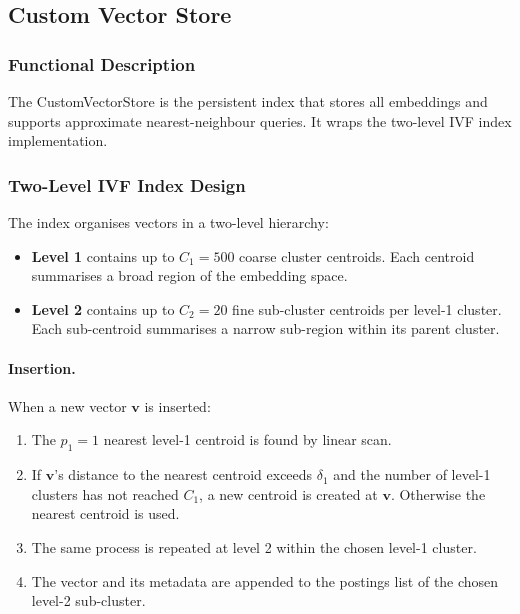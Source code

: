 \documentclass[12pt, a4paper]{report}
\begin{document}
\subsection{Custom Vector Store}

\subsubsection{Functional Description}

The CustomVectorStore is the persistent index that stores all embeddings
and supports approximate nearest-neighbour queries. It wraps the two-level
IVF index implementation.

\subsubsection{Two-Level IVF Index Design}

The index organises vectors in a two-level hierarchy:

\begin{itemize}
  \item \textbf{Level 1} contains up to $C_1 = 500$ coarse cluster centroids.
    Each centroid summarises a broad region of the embedding space.
  \item \textbf{Level 2} contains up to $C_2 = 20$ fine sub-cluster
    centroids per level-1 cluster. Each sub-centroid summarises a narrow
    sub-region within its parent cluster.
\end{itemize}

\paragraph{Insertion.}
When a new vector $\mathbf{v}$ is inserted:
\begin{enumerate}
  \item The $p_1 = 1$ nearest level-1 centroid is found by linear scan.
  \item If $\mathbf{v}$'s distance to the nearest centroid exceeds $\delta_1$
    and the number of level-1 clusters has not reached $C_1$, a new centroid
    is created at $\mathbf{v}$. Otherwise the nearest centroid is used.
  \item The same process is repeated at level 2 within the chosen level-1 cluster.
  \item The vector and its metadata are appended to the postings list of
    the chosen level-2 sub-cluster.
\end{enumerate}
\end{document}
